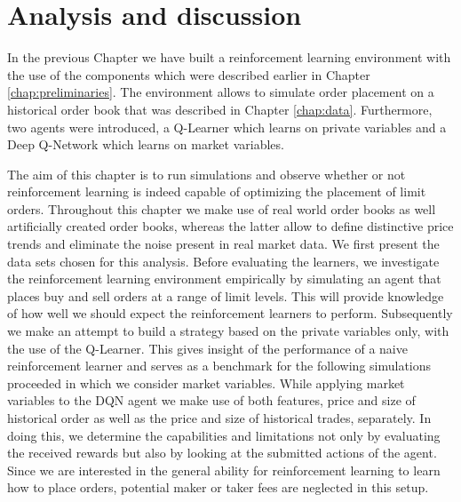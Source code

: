 \chapter{Analysis and discussion}
\label{chap:analysis}

In the previous Chapter we have built a reinforcement learning environment with the use of the components which were described earlier in Chapter \ref{chap:preliminaries}.
The environment allows to simulate order placement on a historical order book that was described in Chapter \ref{chap:data}.
Furthermore, two agents were introduced, a Q-Learner which learns on private variables and a Deep Q-Network which learns on market variables.

The aim of this chapter is to run simulations and observe whether or not reinforcement learning is indeed capable of optimizing the placement of limit orders.
Throughout this chapter we make use of real world order books as well artificially created order books, whereas the latter allow to define distinctive price trends and eliminate the noise present in real market data.
We first present the data sets chosen for this analysis.
Before evaluating the learners, we investigate the reinforcement learning environment empirically by simulating an agent that places buy and sell orders at a range of limit levels.
This will provide knowledge of how well we should expect the reinforcement learners to perform.
Subsequently we make an attempt to build a strategy based on the private variables only, with the use of the Q-Learner.
This gives insight of the performance of a naive reinforcement learner and  serves as a benchmark for the following simulations proceeded in which we consider market variables.
While applying market variables to the DQN agent we make use of both features, price and size of historical order as well as the price and size of historical trades, separately.
In doing this, we determine the capabilities and limitations not only by evaluating the received rewards but also by looking at the submitted actions of the agent.
Since we are interested in the general ability for reinforcement learning to learn how to place orders, potential maker or taker fees are neglected in this setup.

